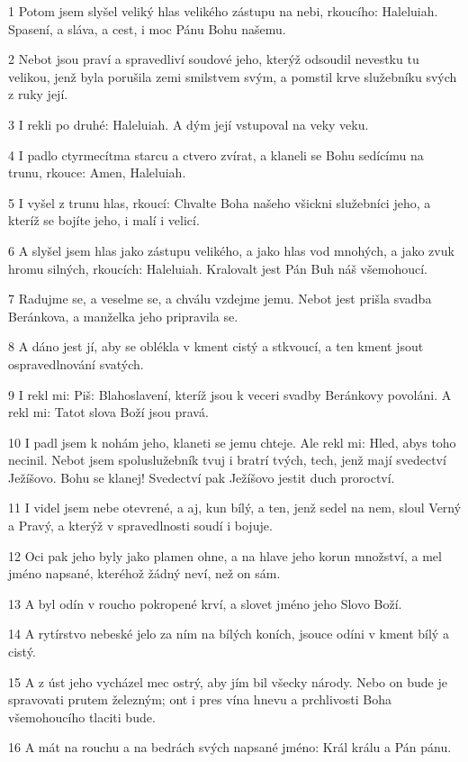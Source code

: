 \par 1 Potom jsem slyšel veliký hlas velikého zástupu na nebi, rkoucího: Haleluiah. Spasení, a sláva, a cest, i moc Pánu Bohu našemu.
\par 2 Nebot jsou praví a spravedliví soudové jeho, kterýž odsoudil nevestku tu velikou, jenž byla porušila zemi smilstvem svým, a pomstil krve služebníku svých z ruky její.
\par 3 I rekli po druhé: Haleluiah. A dým její vstupoval na veky veku.
\par 4 I padlo ctyrmecítma starcu a ctvero zvírat, a klaneli se Bohu sedícímu na trunu, rkouce: Amen, Haleluiah.
\par 5 I vyšel z trunu hlas, rkoucí: Chvalte Boha našeho všickni služebníci jeho, a kteríž se bojíte jeho, i malí i velicí.
\par 6 A slyšel jsem hlas jako zástupu velikého, a jako hlas vod mnohých, a jako zvuk hromu silných, rkoucích: Haleluiah. Kralovalt jest Pán Buh náš všemohoucí.
\par 7 Radujme se, a veselme se, a chválu vzdejme jemu. Nebot jest prišla svadba Beránkova, a manželka jeho pripravila se.
\par 8 A dáno jest jí, aby se oblékla v kment cistý a stkvoucí, a ten kment jsout ospravedlnování svatých.
\par 9 I rekl mi: Piš: Blahoslavení, kteríž jsou k veceri svadby Beránkovy povoláni. A rekl mi: Tatot slova Boží jsou pravá.
\par 10 I padl jsem k nohám jeho, klaneti se jemu chteje. Ale rekl mi: Hled, abys toho necinil. Nebot jsem spoluslužebník tvuj i bratrí tvých, tech, jenž mají svedectví Ježíšovo. Bohu se klanej! Svedectví pak Ježíšovo jestit duch proroctví.
\par 11 I videl jsem nebe otevrené, a aj, kun bílý, a ten, jenž sedel na nem, sloul Verný a Pravý, a kterýž v spravedlnosti soudí i bojuje.
\par 12 Oci pak jeho byly jako plamen ohne, a na hlave jeho korun množství, a mel jméno napsané, kteréhož žádný neví, než on sám.
\par 13 A byl odín v roucho pokropené krví, a slovet jméno jeho Slovo Boží.
\par 14 A rytírstvo nebeské jelo za ním na bílých koních, jsouce odíni v kment bílý a cistý.
\par 15 A z úst jeho vycházel mec ostrý, aby jím bil všecky národy. Nebo on bude je spravovati prutem železným; ont i pres vína hnevu a prchlivosti Boha všemohoucího tlaciti bude.
\par 16 A mát na rouchu a na bedrách svých napsané jméno: Král králu a Pán pánu.
